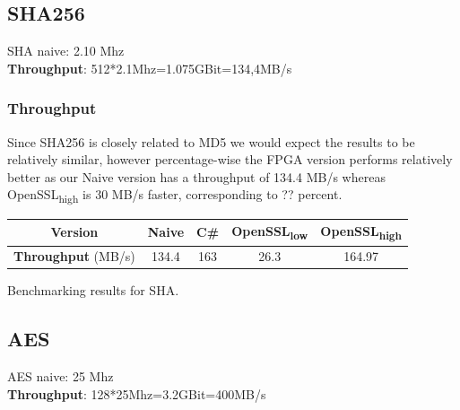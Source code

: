 \documentclass[a4paper]{article}
\begin{document}
\subsection{SHA256}
\label{sec:orgad9adbe}
SHA naive: 2.10 Mhz\\
\textbf{Throughput}: 512*2.1Mhz=1.075GBit=134,4MB/s
\subsubsection{Throughput}
\label{sec:org4d64783}
Since SHA256 is closely related to MD5 we would expect the results to be relatively similar, however percentage-wise the FPGA version performs relatively better as our Naive version has a throughput of 134.4 MB/s whereas OpenSSL\textsubscript{high} is 30 MB/s faster, corresponding to ?? percent.
\begin{table}[htbp]
\centering
\begin{tabular}{|c|c|c|c|c|}
\hline
\textbf{Version} & Naive & C\# & OpenSSL\textsubscript{low} & OpenSSL\textsubscript{high}\\
\hline
\textbf{Throughput} (MB/s) & 134.4 & 163 & 26.3 & 164.97\\
\hline
\end{tabular}
Benchmarking results for SHA.

\end{table}

\subsection{AES}
\label{sec:org8e75c2c}
AES naive: 25 Mhz\\
\textbf{Throughput}: 128*25Mhz=3.2GBit=400MB/s
\end{document}
